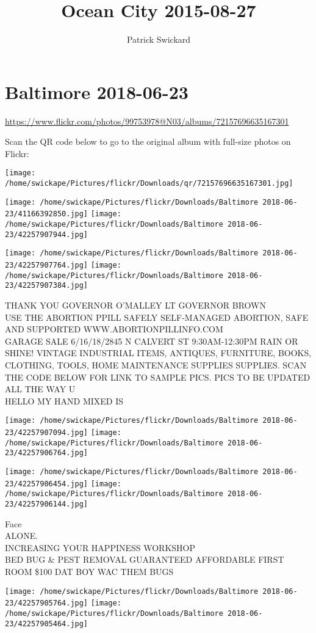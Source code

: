 \documentclass[10pt,letterpaper]{article}
\title{Ocean City 2015-08-27}
\author{Patrick Swickard}
\date{}
\begin{document}
\section*{Baltimore 2018-06-23}

\url{https://www.flickr.com/photos/99753978@N03/albums/72157696635167301}

Scan the QR code below to go to the original album with full-size photos on Flickr:

\texttt{[image: /home/swickape/Pictures/flickr/Downloads/qr/72157696635167301.jpg]}
\pagebreak

\texttt{[image: /home/swickape/Pictures/flickr/Downloads/Baltimore 2018-06-23/41166392850.jpg]}
\texttt{[image: /home/swickape/Pictures/flickr/Downloads/Baltimore 2018-06-23/42257907944.jpg]}

\texttt{[image: /home/swickape/Pictures/flickr/Downloads/Baltimore 2018-06-23/42257907764.jpg]}
\texttt{[image: /home/swickape/Pictures/flickr/Downloads/Baltimore 2018-06-23/42257907384.jpg]}

THANK YOU GOVERNOR O'MALLEY LT GOVERNOR BROWN\\
USE THE ABORTION PPILL SAFELY SELF{-}MANAGED ABORTION, SAFE AND SUPPORTED WWW.ABORTIONPILLINFO.COM\\
GARAGE SALE 6/16/18/2845 N CALVERT ST 9:30AM{-}12:30PM RAIN OR SHINE!  VINTAGE INDUSTRIAL ITEMS, ANTIQUES, FURNITURE, BOOKS, CLOTHING, TOOLS, HOME MAINTENANCE SUPPLIES SUPPLIES.  SCAN THE CODE BELOW FOR LINK TO SAMPLE PICS.  PICS TO BE UPDATED ALL THE WAY U\\
HELLO MY HAND MIXED IS
\pagebreak

\texttt{[image: /home/swickape/Pictures/flickr/Downloads/Baltimore 2018-06-23/42257907094.jpg]}
\texttt{[image: /home/swickape/Pictures/flickr/Downloads/Baltimore 2018-06-23/42257906764.jpg]}

\texttt{[image: /home/swickape/Pictures/flickr/Downloads/Baltimore 2018-06-23/42257906454.jpg]}
\texttt{[image: /home/swickape/Pictures/flickr/Downloads/Baltimore 2018-06-23/42257906144.jpg]}

Face\\
ALONE.\\
INCREASING YOUR HAPPINESS WORKSHOP\\
BED BUG \& PEST REMOVAL GUARANTEED AFFORDABLE FIRST ROOM \$100 DAT BOY WAC THEM BUGS
\pagebreak

\texttt{[image: /home/swickape/Pictures/flickr/Downloads/Baltimore 2018-06-23/42257905764.jpg]}
\texttt{[image: /home/swickape/Pictures/flickr/Downloads/Baltimore 2018-06-23/42257905464.jpg]}
\end{document}
